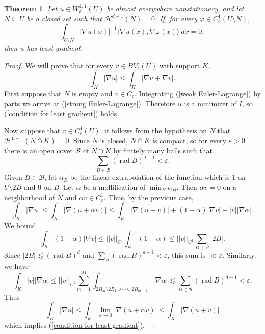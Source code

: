 \documentclass[reqno,12pt,letterpaper]{amsart}
\DeclareMathOperator{\rad}{rad}
\newtheorem{theorem}{Theorem}[section]
\theoremstyle{definition}
\numberwithin{equation}{section}
\begin{document}
\begin{theorem}
Let $u \in W^{1,1}_l(U)$ be almost everywhere nonstationary, and let $N \subseteq U$ be a closed set such that $\mathcal H^{d-1}(N) = 0$.
If, for every $\varphi \in C^1_c(U \setminus N)$,
\begin{equation}
\label{weak Euler-Lagrange}
\int_{U \setminus N} |\nabla u(x)|^{-1} \langle \nabla u(x), \nabla \varphi(x)\rangle ~dx = 0,
\end{equation}
then $u$ has least gradient.
\end{theorem}
\begin{proof}
We will prove that for every $v \in BV_c(U)$ with support $K$,
\begin{equation}
\label{condition for least gradient}
\int_K |\nabla u| \leq \int_K |\nabla u + \nabla v|.
\end{equation}
First suppose that $N$ is empty and $v \in C_c$. Integrating (\ref{weak Euler-Lagrange}) by parts we arrive at (\ref{strong Euler-Lagrange}).
Therefore $u$ is a minimizer of $I$, so (\ref{condition for least gradient}) holds.

Now suppose that $v \in C^1_c(U)$; it follows from the hypothesis on $N$ that $\mathcal H^{n-1}(N \cap K) = 0$.
Since $N$ is closed, $N \cap K$ is compact, so for every $\varepsilon > 0$ there is an open cover $\mathcal B$ of $N \cap K$ by finitely many balls such that
$$\sum_{B \in \mathcal B} (\rad B)^{d - 1} < \varepsilon.$$
Given $B \in \mathcal B$, let $\alpha_B$ be the linear extrapolation of the function which is $1$ on $U \setminus 2B$ and $0$ on $B$.
Let $\alpha$ be a mollification of $\min_B \alpha_B$. Then $\alpha v = 0$ on a neighborhood of $N$ and $\alpha v \in C^1_c$. Thus, by the previous case,
$$\int_K |\nabla u| \leq \int_K |\nabla(u + \alpha v)| \leq \int_K |\nabla (u + v)| + (1-\alpha)|\nabla v| + |v||\nabla \alpha|.$$
We bound
$$\int_K (1-\alpha)|\nabla v| \leq ||v||_{C^1} \int_K (1 - \alpha) \leq ||v||_{C^1} \sum_{B \in \mathcal B} |2B|.$$
Since $|2B| \lesssim (\rad B)^d$ and $\sum_B (\rad B)^{d - 1} < \varepsilon$, this sum is $\ll \varepsilon$.
Similarly, we have
$$\int_K |v||\nabla \alpha| \leq ||v||_{C^1} \sum_{m=1}^M \int_{2B_m \setminus 2B_1 \cup \cdots \cup 2B_{m - 1}} |\nabla \alpha| \lesssim \sum_{B \in \mathcal B} (\rad B)^{d - 1} < \varepsilon.$$
Thus
$$\int_K |\nabla u| \leq \int_K \lim_{\varepsilon \to 0} |\nabla (u + \alpha v)| \leq \int_K |\nabla (u + v)|$$
which implies (\ref{condition for least gradient}).


\end{proof}
\end{document}
